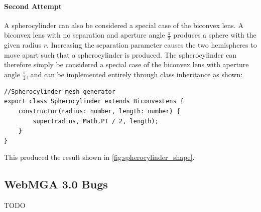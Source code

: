 \paragraph{Second Attempt}

A spherocylinder can also be considered a special case of the biconvex lens. A biconvex lens with no separation and aperture angle $\frac{\pi}{2}$ produces a sphere with the given radius $r$. Increasing the separation parameter causes the two hemispheres to move apart such that a spherocylinder is produced. The spherocylinder can therefore simply be considered a special case of the biconvex lens with aperture angle $\frac{\pi}{2}$, and can be implemented entirely through class inheritance as shown:
\begin{lstlisting}
//Spherocylinder mesh generator
export class Spherocylinder extends BiconvexLens {
    constructor(radius: number, length: number) {
        super(radius, Math.PI / 2, length);
    }
}
\end{lstlisting}
This produced the result shown in \cref{fig:spherocylinder_shape}.

\subsection{WebMGA 3.0 Bugs}
TODO
